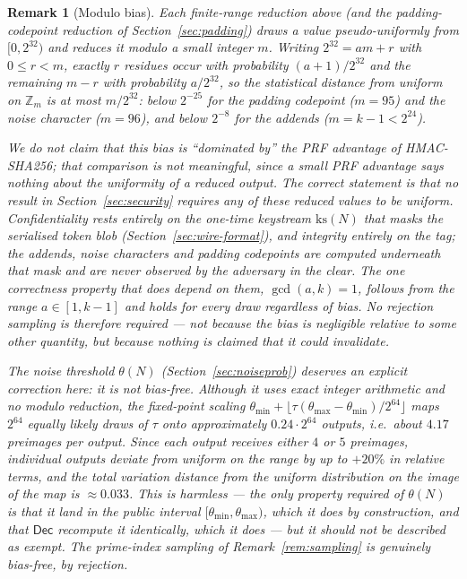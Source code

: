\documentclass[11pt,a4paper]{article}
\newtheorem{remark}[theorem]{Remark}
\begin{document}
\begin{remark}[Modulo bias]\label{rem:modbias}
Each finite-range reduction above (and the padding-codepoint reduction of
Section~\ref{sec:padding}) draws a value pseudo-uniformly from
$[0,2^{32})$ and reduces it modulo a small integer $m$. Writing
$2^{32}=am+r$ with $0\le r<m$, exactly $r$ residues occur with probability
$(a+1)/2^{32}$ and the remaining $m-r$ with probability $a/2^{32}$, so the
statistical distance from uniform on $\mathbb{Z}_m$ is at most $m/2^{32}$:
below $2^{-25}$ for the padding codepoint ($m=95$) and the noise character
($m=96$), and below $2^{-8}$ for the addends ($m=k-1<2^{24}$).

We do \emph{not} claim that this bias is ``dominated by'' the PRF advantage
of HMAC-SHA256; that comparison is not meaningful, since a small PRF
advantage says nothing about the uniformity of a reduced output. The
correct statement is that no result in Section~\ref{sec:security} requires
any of these reduced values to be uniform. Confidentiality rests entirely
on the one-time keystream $\mathrm{ks}(N)$ that masks the serialised token
blob (Section~\ref{sec:wire-format}), and integrity entirely on the tag;
the addends, noise characters and padding codepoints are computed
\emph{underneath} that mask and are never observed by the adversary in the
clear. The one correctness property that does depend on them,
$\gcd(a,k)=1$, follows from the range $a\in[1,k-1]$ and holds for every
draw regardless of bias. No rejection sampling is therefore required — not
because the bias is negligible relative to some other quantity, but because
nothing is claimed that it could invalidate.

The noise threshold $\theta(N)$ (Section~\ref{sec:noiseprob}) deserves an
explicit correction here: it is \emph{not} bias-free. Although it uses exact
integer arithmetic and no modulo reduction, the fixed-point scaling
$\theta_{\min}+\lfloor\tau(\theta_{\max}-\theta_{\min})/2^{64}\rfloor$ maps
$2^{64}$ equally likely draws of $\tau$ onto approximately
$0.24\cdot2^{64}$ outputs, i.e.\ about $4.17$ preimages per output. Since
each output receives either $4$ or $5$ preimages, individual outputs
deviate from uniform on the range by up to $+20\%$ in relative terms, and
the total variation distance from the uniform distribution on the image of
the map is $\approx0.033$. This is harmless — the
only property required of $\theta(N)$ is that it land in the public
interval $[\theta_{\min},\theta_{\max})$, which it does by construction,
and that $\mathsf{Dec}$ recompute it identically, which it does — but it
should not be described as exempt. The prime-index sampling of
Remark~\ref{rem:sampling} is genuinely bias-free, by rejection.


\end{remark}
\end{document}
